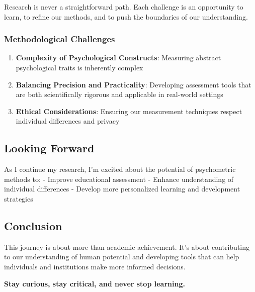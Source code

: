 \documentclass[
]{article}
\providecommand{\tightlist}{%
  \setlength{\itemsep}{0pt}\setlength{\parskip}{0pt}}
\begin{document}
Research is never a straightforward path. Each challenge is an
opportunity to learn, to refine our methods, and to push the boundaries
of our understanding.

\subsubsection{Methodological
Challenges}\label{methodological-challenges}

\begin{enumerate}
\def\labelenumi{\arabic{enumi}.}
\tightlist
\item
  \textbf{Complexity of Psychological Constructs}: Measuring abstract
  psychological traits is inherently complex
\item
  \textbf{Balancing Precision and Practicality}: Developing assessment
  tools that are both scientifically rigorous and applicable in
  real-world settings
\item
  \textbf{Ethical Considerations}: Ensuring our measurement techniques
  respect individual differences and privacy
\end{enumerate}

\subsection{Looking Forward}\label{looking-forward}

As I continue my research, I'm excited about the potential of
psychometric methods to: - Improve educational assessment - Enhance
understanding of individual differences - Develop more personalized
learning and development strategies

\subsection{Conclusion}\label{conclusion}

This journey is about more than academic achievement. It's about
contributing to our understanding of human potential and developing
tools that can help individuals and institutions make more informed
decisions.

\textbf{Stay curious, stay critical, and never stop learning.}
\end{document}
